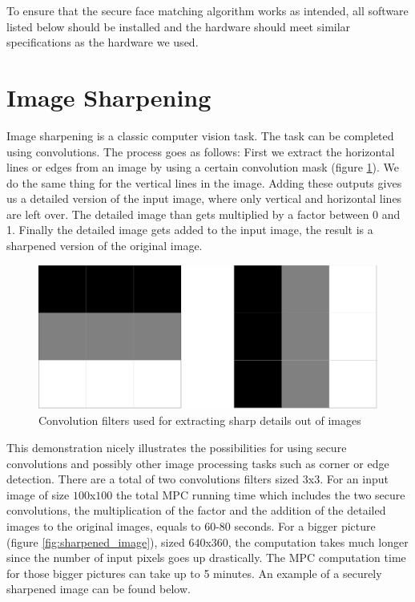 To ensure that the secure face matching algorithm works as intended, all software listed below should be installed and the hardware should meet similar specifications as the hardware we used.

\section{Image Sharpening}
Image sharpening is a classic computer vision task. The task can be completed using convolutions. The process goes as follows: First we extract the horizontal lines or edges from an image by using a certain convolution mask (figure \ref{fig:sharp_mask}). We do the same thing for the vertical lines in the image. Adding these outputs gives us a detailed version of the input image, where only vertical and horizontal lines are left over. The detailed image than gets multiplied by a factor between 0 and 1. Finally the detailed image gets added to the input image, the result is a sharpened version of the original image.

\begin{figure}[H]
  \includegraphics[scale=0.2]{fig/sharp_mask.png}
  \centering
  \caption{Convolution filters used for extracting sharp details out of images}
  \label{fig:sharp_mask}
\end{figure}

This demonstration nicely illustrates the possibilities for using secure convolutions and possibly other image processing tasks such as corner or edge detection. There are a total of two convolutions filters sized $3$x$3$. For an input image of size $100$x$100$ the total MPC running time which includes the two secure convolutions, the multiplication of the factor and the addition of the detailed images to the original images, equals to 60-80 seconds. For a bigger picture (figure \ref{fig:sharpened_image}), sized $640$x$360$, the computation takes much longer since the number of input pixels goes up drastically. The MPC computation time for those bigger pictures can take up to 5 minutes. An example of a securely sharpened image can be found below.

